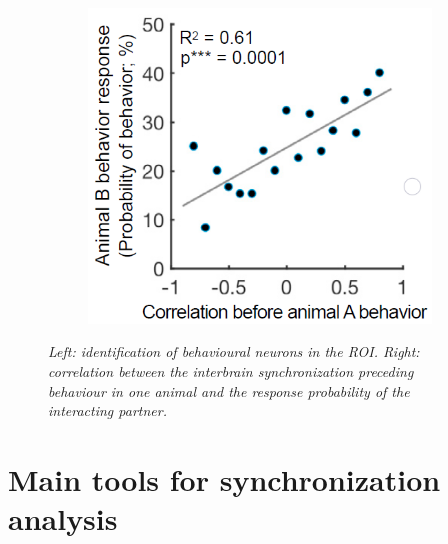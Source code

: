 \documentclass[12pt, a4paper]{report}
\begin{document}
\begin{figure}[H]
\begin{minipage}{\linewidth}
\begin{minipage}{0.35\linewidth}
\begin{figure}[H]
			\end{figure}
		\end{minipage}
		\hspace{0.05\linewidth}
		\begin{minipage}{0.4\linewidth}
			\begin{figure}[H]
				\includegraphics[width=\linewidth]{kingsbury3.png}
				
			\end{figure}
		\end{minipage}
		
	\end{minipage}
	\caption{\textit{Left: identification of behavioural neurons in the ROI.
			Right: correlation between the interbrain synchronization preceding behaviour in one animal and the response probability of the interacting partner.}} \label{classification}
\end{figure}

\newpage



\chapter{Main tools for synchronization analysis} 
\end{document}
